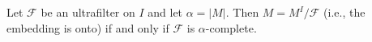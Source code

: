 Let $\mathcal{F}$ be an ultrafilter on $I$ and let $\alpha = |M|$. Then $M = M^I / \mathcal{F}$ (i.e., the embedding is onto) if and only if $\mathcal{F}$ is $\alpha$-complete.
